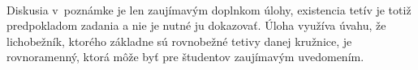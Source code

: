 {\\
\kom Diskusia v~poznámke je len zaujímavým doplnkom úlohy, existencia tetív je totiž predpokladom zadania a nie je nutné ju dokazovať. Úloha využíva úvahu, že lichobežník, ktorého základne sú rovnobežné tetivy danej kružnice, je rovnoramenný, ktorá môže byť pre študentov zaujímavým uvedomením.\\
}